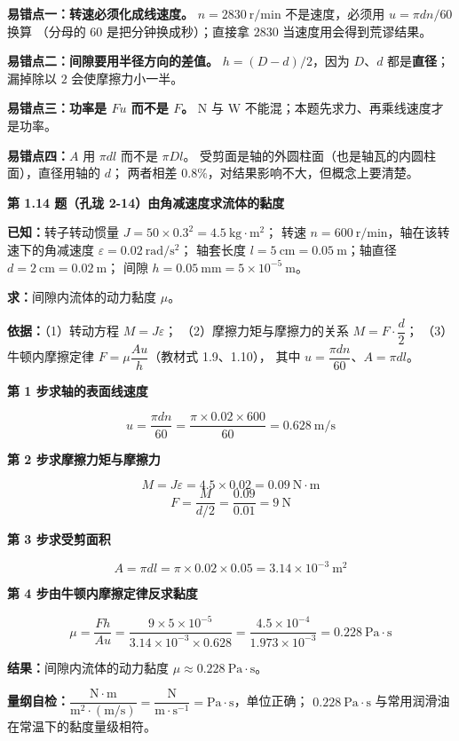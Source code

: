 \begin{yicuo}
\textbf{易错点一：转速必须化成线速度。}
$n=2830\ \mathrm{r/min}$ 不是速度，必须用 $u=\pi d n/60$ 换算
（分母的 $60$ 是把分钟换成秒）；直接拿 $2830$ 当速度用会得到荒谬结果。

\textbf{易错点二：间隙要用半径方向的差值。}
$h=(D-d)/2$，因为 $D$、$d$ 都是\textbf{直径}；
漏掉除以 $2$ 会使摩擦力小一半。

\textbf{易错点三：功率是 $F u$ 而不是 $F$。}
$\mathrm{N}$ 与 $\mathrm{W}$ 不能混；本题先求力、再乘线速度才是功率。

\textbf{易错点四：}$A$ 用 $\pi d l$ 而不是 $\pi D l$。
受剪面是轴的外圆柱面（也是轴瓦的内圆柱面），直径用轴的 $d$；
两者相差 $0.8\%$，对结果影响不大，但概念上要清楚。
\end{yicuo}

\noindent\textbf{第 1.14 题（孔珑 2-14）\quad 由角减速度求流体的黏度}

\begin{jie}
\textbf{已知：}转子转动惯量 $J=50\times0.3^{2}=4.5\ \mathrm{kg\cdot m^2}$；
转速 $n=600\ \mathrm{r/min}$，轴在该转速下的角减速度
$\varepsilon=0.02\ \mathrm{rad/s^2}$；
轴套长度 $l=5\ \mathrm{cm}=0.05\ \mathrm{m}$；轴直径 $d=2\ \mathrm{cm}=0.02\ \mathrm{m}$；
间隙 $h=0.05\ \mathrm{mm}=5\times10^{-5}\ \mathrm{m}$。

\textbf{求：}间隙内流体的动力黏度 $\mu$。

\textbf{依据：}（1）转动方程 $M=J\varepsilon$；
（2）摩擦力矩与摩擦力的关系 $M=F\cdot\dfrac{d}{2}$；
（3）牛顿内摩擦定律 $F=\mu\dfrac{A u}{h}$（教材式 1.9、1.10），
其中 $u=\dfrac{\pi d n}{60}$、$A=\pi d l$。

\textbf{第 1 步\quad 求轴的表面线速度}

\[ u=\frac{\pi d n}{60}=\frac{\pi\times0.02\times600}{60}=0.628\ \mathrm{m/s} \]

\textbf{第 2 步\quad 求摩擦力矩与摩擦力}

\[ M=J\varepsilon=4.5\times0.02=0.09\ \mathrm{N\cdot m} \]
\[ F=\frac{M}{d/2}=\frac{0.09}{0.01}=9\ \mathrm{N} \]

\textbf{第 3 步\quad 求受剪面积}

\[ A=\pi d l=\pi\times0.02\times0.05=3.14\times10^{-3}\ \mathrm{m^2} \]

\textbf{第 4 步\quad 由牛顿内摩擦定律反求黏度}

\[ \mu=\frac{Fh}{Au}=\frac{9\times5\times10^{-5}}{3.14\times10^{-3}\times0.628}
     =\frac{4.5\times10^{-4}}{1.973\times10^{-3}}=0.228\ \mathrm{Pa\cdot s} \]

\textbf{结果：}间隙内流体的动力黏度 $\mu\approx0.228\ \mathrm{Pa\cdot s}$。

\textbf{量纲自检：}$\dfrac{\mathrm{N}\cdot\mathrm{m}}{\mathrm{m^2}\cdot(\mathrm{m/s})}
=\dfrac{\mathrm{N}}{\mathrm{m}\cdot\mathrm{s^{-1}}}=\mathrm{Pa\cdot s}$，单位正确；
$0.228\ \mathrm{Pa\cdot s}$ 与常用润滑油在常温下的黏度量级相符。
\end{jie}

